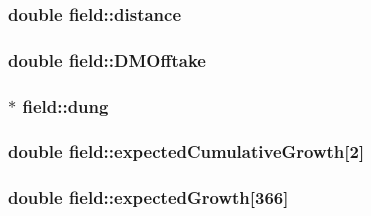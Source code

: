 \label{classfield_ab8ea98f5c1a6daf2e61deb15c6b3370e}
\hypertarget{classfield_a477599b3c8ed6a953d27dc2d2db2cfcc}{
\subsubsection[{distance}]{\setlength{\rightskip}{0pt plus 5cm}double {\bf field::distance}}}
\label{classfield_a477599b3c8ed6a953d27dc2d2db2cfcc}
\hypertarget{classfield_a99af7d28a2e26d37e1e6fc170bb7c416}{
\subsubsection[{DMOfftake}]{\setlength{\rightskip}{0pt plus 5cm}double {\bf field::DMOfftake}}}
\label{classfield_a99af7d28a2e26d37e1e6fc170bb7c416}
\hypertarget{classfield_a70a2a287278fc7614895337ecebd75ea}{
\subsubsection[{dung}]{$\ast$ {\bf field::dung}}}
\label{classfield_a70a2a287278fc7614895337ecebd75ea}
\hypertarget{classfield_a54956ebaa2b763b10fbcc7cf81e1d27d}{
\subsubsection[{expectedCumulativeGrowth}]{\setlength{\rightskip}{0pt plus 5cm}double {\bf field::expectedCumulativeGrowth}\mbox{[}2\mbox{]}}}
\label{classfield_a54956ebaa2b763b10fbcc7cf81e1d27d}
\hypertarget{classfield_ab34c30afdf90e35b899c7a4120db6566}{
\subsubsection[{expectedGrowth}]{\setlength{\rightskip}{0pt plus 5cm}double {\bf field::expectedGrowth}\mbox{[}366\mbox{]}}}
